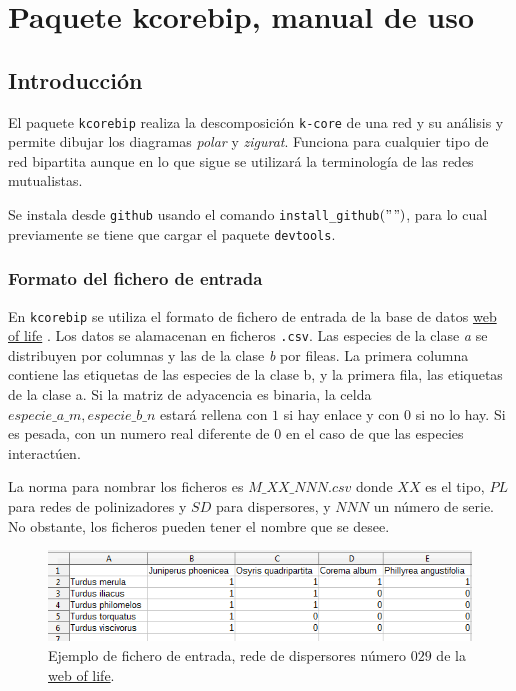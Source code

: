 
\appendix
\renewcommand{\thechapter}{A}
\chapter{Paquete kcorebip, manual de uso} %

\label{APP_KCOREMANBIP} %

\section*{Introducción}

El paquete \texttt{kcorebip} realiza la descomposición \texttt{k-core} de una red y su análisis y permite dibujar los diagramas \textit{polar}
y \textit{zigurat}. Funciona para cualquier tipo de red bipartita aunque en lo que sigue se utilizará la terminología de las redes mutualistas.

Se instala desde \texttt{github} usando el comando \texttt{install\_github}$("$$")$, para lo cual previamente se tiene que cargar el paquete \texttt{devtools}.
 
\subsection*{Formato del fichero de entrada}
\label{input_file_format}

En \texttt{kcorebip} se utiliza el formato de fichero de entrada de la base de datos \href{http://www.web-of-life.es/}{web of life} \cite{bascompte2009}. Los datos se alamacenan en ficheros \texttt{.csv}. Las especies de la clase \textit{a} se distribuyen por columnas y las de la clase \textit{b} por fileas. La primera columna contiene las etiquetas de las especies de la clase b, y la primera fila, las etiquetas de la clase a. Si la matriz de adyacencia es binaria, la celda $especie\_a\_m,especie\_b\_n$ estará rellena con $1$ si hay enlace y con $0$ si no lo hay. Si es pesada, con un numero real diferente de $0$ en el caso de que las especies interactúen.

La norma para nombrar los ficheros es $M\_XX\_NNN.csv$ donde $XX$ es el tipo, $PL$ para redes de polinizadores y $SD$ para dispersores, y $NNN$ un número de serie. No obstante, los ficheros pueden tener el nombre que se desee.

\begin{figure}[h!]
\centering
\includegraphics[scale=0.8]{ManFigs/SD_029_csv.png}
\caption {Ejemplo de fichero de entrada, rede de dispersores número $029$ de la \href{http://www.web-of-life.es/}{web of life}.}
\label{fig:AKMAN_red_example}
\end{figure}

